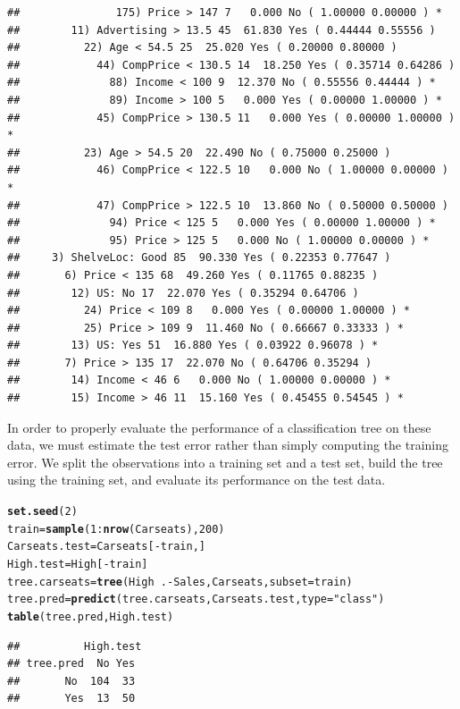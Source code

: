\documentclass[12pt]{article}\usepackage[]{graphicx}\usepackage[]{color}
\makeatletter
\newcommand{\hlnum}[1]{\textcolor[rgb]{0.686,0.059,0.569}{#1}}%
\newcommand{\hlstr}[1]{\textcolor[rgb]{0.192,0.494,0.8}{#1}}%
\newcommand{\hlopt}[1]{\textcolor[rgb]{0,0,0}{#1}}%
\newcommand{\hlstd}[1]{\textcolor[rgb]{0.345,0.345,0.345}{#1}}%
\newcommand{\hlkwb}[1]{\textcolor[rgb]{0.69,0.353,0.396}{#1}}%
\newcommand{\hlkwc}[1]{\textcolor[rgb]{0.333,0.667,0.333}{#1}}%
\newcommand{\hlkwd}[1]{\textcolor[rgb]{0.737,0.353,0.396}{\textbf{#1}}}%
\newenvironment{kframe}{%
 \def\at@end@of@kframe{}%
 \ifinner\ifhmode%
  \def\at@end@of@kframe{\end{minipage}}%
  \begin{minipage}{\columnwidth}%
 \fi\fi%
 \def\FrameCommand##1{\hskip\@totalleftmargin \hskip-\fboxsep
 \colorbox{shadecolor}{##1}\hskip-\fboxsep
     \hskip-\linewidth \hskip-\@totalleftmargin \hskip\columnwidth}%
 \MakeFramed {\advance\hsize-\width
   \@totalleftmargin\z@ \linewidth\hsize
   \@setminipage}}%
 {\par\unskip\endMakeFramed%
 \at@end@of@kframe}
\newenvironment{knitrout}{}{} %
\makeatother
\begin{document}
\begin{knitrout}
\begin{kframe}
\begin{verbatim}
##               175) Price > 147 7   0.000 No ( 1.00000 0.00000 ) *
##        11) Advertising > 13.5 45  61.830 Yes ( 0.44444 0.55556 )  
##          22) Age < 54.5 25  25.020 Yes ( 0.20000 0.80000 )  
##            44) CompPrice < 130.5 14  18.250 Yes ( 0.35714 0.64286 )  
##              88) Income < 100 9  12.370 No ( 0.55556 0.44444 ) *
##              89) Income > 100 5   0.000 Yes ( 0.00000 1.00000 ) *
##            45) CompPrice > 130.5 11   0.000 Yes ( 0.00000 1.00000 ) *
##          23) Age > 54.5 20  22.490 No ( 0.75000 0.25000 )  
##            46) CompPrice < 122.5 10   0.000 No ( 1.00000 0.00000 ) *
##            47) CompPrice > 122.5 10  13.860 No ( 0.50000 0.50000 )  
##              94) Price < 125 5   0.000 Yes ( 0.00000 1.00000 ) *
##              95) Price > 125 5   0.000 No ( 1.00000 0.00000 ) *
##     3) ShelveLoc: Good 85  90.330 Yes ( 0.22353 0.77647 )  
##       6) Price < 135 68  49.260 Yes ( 0.11765 0.88235 )  
##        12) US: No 17  22.070 Yes ( 0.35294 0.64706 )  
##          24) Price < 109 8   0.000 Yes ( 0.00000 1.00000 ) *
##          25) Price > 109 9  11.460 No ( 0.66667 0.33333 ) *
##        13) US: Yes 51  16.880 Yes ( 0.03922 0.96078 ) *
##       7) Price > 135 17  22.070 No ( 0.64706 0.35294 )  
##        14) Income < 46 6   0.000 No ( 1.00000 0.00000 ) *
##        15) Income > 46 11  15.160 Yes ( 0.45455 0.54545 ) *
\end{verbatim}
\end{kframe}
\end{knitrout}

In order to properly evaluate the performance of a classification tree on these data, we must estimate the test error rather than simply computing the training error. We split the observations into a training set and a test set, build the tree using the training set, and evaluate its performance on the test data.
\begin{knitrout}
\color{fgcolor}\begin{kframe}
\begin{alltt}
\hlkwd{set.seed}\hlstd{(}\hlnum{2}\hlstd{)}
\hlstd{train} \hlkwb{=} \hlkwd{sample}\hlstd{(}\hlnum{1}\hlopt{:}\hlkwd{nrow}\hlstd{(Carseats),} \hlnum{200}\hlstd{)}
\hlstd{Carseats.test} \hlkwb{=} \hlstd{Carseats[}\hlopt{-}\hlstd{train,]}
\hlstd{High.test} \hlkwb{=} \hlstd{High[}\hlopt{-}\hlstd{train]}
\hlstd{tree.carseats}\hlkwb{=}\hlkwd{tree}\hlstd{(High}\hlopt{~}\hlstd{.}\hlopt{-}\hlstd{Sales, Carseats,} \hlkwc{subset} \hlstd{= train)}
\hlstd{tree.pred} \hlkwb{=} \hlkwd{predict}\hlstd{(tree.carseats, Carseats.test,} \hlkwc{type}\hlstd{=}\hlstr{"class"}\hlstd{)}
\hlkwd{table}\hlstd{(tree.pred, High.test)}
\end{alltt}
\begin{verbatim}
##          High.test
## tree.pred  No Yes
##       No  104  33
##       Yes  13  50
\end{verbatim}
\end{kframe}
\end{knitrout}
\end{document}
